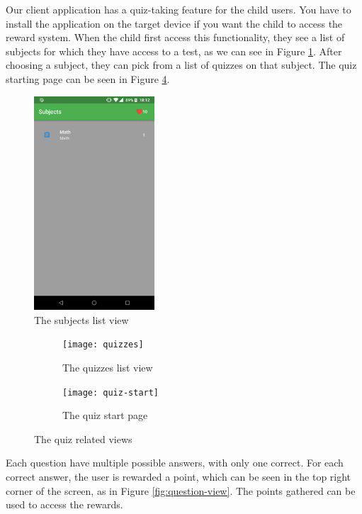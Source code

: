 Our client application has a quiz-taking feature for the child users. You have to install the application on the target device if you want the child to access the reward system. When the child first access this functionality, they see a list of subjects for which they have access to a test, as we can see in Figure \ref{fig:subjects}. After choosing a subject, they can pick from a list of quizzes on that subject. The quiz starting page can be seen in Figure \ref{fig:quiz-views}.

\begin{figure}[th]
\centering
\includegraphics[width=0.4\textwidth]{Figures/subjects}
\decoRule
\caption{The subjects list view}
\label{fig:subjects}
\end{figure}

\begin{figure}
\centering
\begin{subfigure}{.4\textwidth}
  \centering
  \texttt{[image: quizzes]}
  \caption{The quizzes list view}
  \label{fig:quizzes}
\end{subfigure}%
\begin{subfigure}{.4\textwidth}
  \centering
  \texttt{[image: quiz-start]}
  \caption{The quiz start page}
  \label{fig:quiz-start}
\end{subfigure}
\caption{The quiz related views}
\label{fig:quiz-views}
\end{figure}

Each question have multiple possible answers, with only one correct. For each correct answer, the user is rewarded a point, which can be seen in the top right corner of the screen, as in Figure \ref{fig:question-view}. The points gathered can be used to access the rewards.

